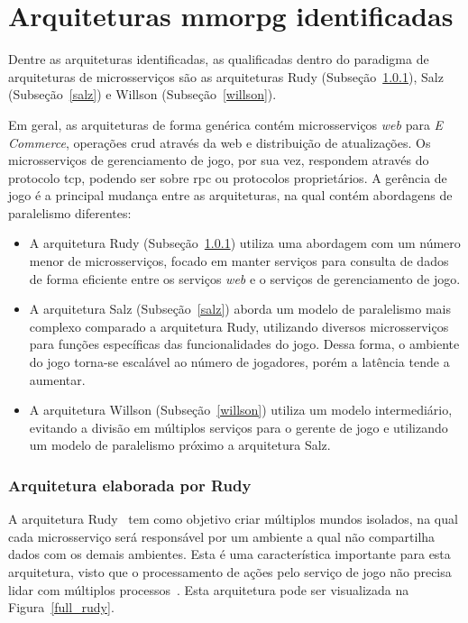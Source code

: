 \chapter{Arquiteturas \ac{mmorpg} identificadas}
\label{cap21}

Dentre as arquiteturas identificadas, as qualificadas dentro do paradigma de arquiteturas de microsserviços são as arquiteturas Rudy (Subseção~\ref{rudy}), Salz (Subseção~\ref{salz}) e Willson (Subseção~\ref{willson}).

Em geral, as arquiteturas de forma genérica contém microsserviços \textit{web} para \textit{E Commerce}, operações \ac{crud} através da web e distribuição de atualizações.
%
Os microsserviços de gerenciamento de jogo, por sua vez, respondem através do protocolo \ac{tcp}, podendo ser sobre \ac{rpc} ou protocolos proprietários.
%
A gerência de jogo é a principal mudança entre as arquiteturas, na qual contém abordagens de paralelismo diferentes:

\begin{itemize}
 \item A arquitetura Rudy (Subseção~\ref{rudy}) utiliza uma abordagem com um número menor de microsserviços, focado em manter serviços para consulta de dados de forma eficiente entre os serviços \textit{web} e o serviços de gerenciamento de jogo.
 \item A arquitetura Salz (Subseção~\ref{salz}) aborda um modelo de paralelismo mais complexo comparado a arquitetura Rudy, utilizando diversos microsserviços para funções específicas das funcionalidades do jogo.
%
Dessa forma, o ambiente do jogo torna-se escalável ao número de jogadores, porém a latência tende a aumentar.
\item A arquitetura Willson (Subseção~\ref{willson}) utiliza um modelo intermediário, evitando a divisão em múltiplos serviços para o gerente de jogo e utilizando um modelo de paralelismo próximo a arquitetura Salz.
\end{itemize}


\subsection{Arquitetura elaborada por Rudy}
\label{rudy}


A arquitetura Rudy~\cite{matthiasrudy2011} tem como objetivo criar múltiplos mundos isolados, na qual cada microsserviço será responsável por um ambiente a qual não compartilha dados com os demais ambientes.
%
Esta é uma característica importante para esta arquitetura, visto que o processamento de ações pelo serviço de jogo não precisa lidar com múltiplos processos~\cite{matthiasrudy2011}.
%
Esta arquitetura pode ser visualizada na Figura~\ref{full_rudy}.

